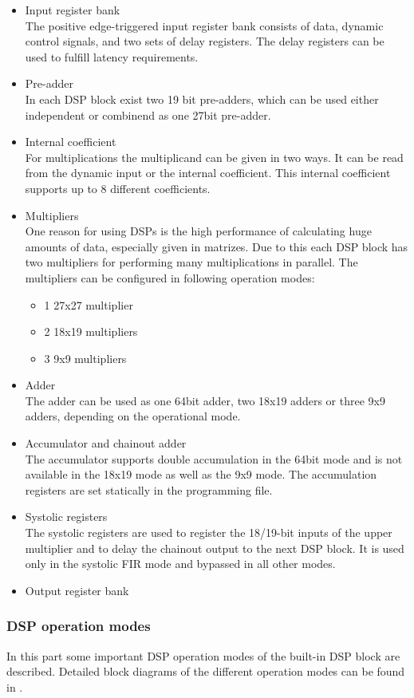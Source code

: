 \begin{itemize}
\item Input register bank\\
The positive edge-triggered input register bank consists of data, dynamic control signals, and two sets of delay registers. The delay registers can be used to fulfill latency requirements.
\item Pre-adder\\
In each DSP block exist two 19 bit pre-adders, which can be used either independent or combinend as one 27bit pre-adder.
\item Internal coefficient\\
For multiplications the multiplicand can be given in two ways. It can be read from the dynamic input or the internal coefficient. This internal coefficient supports up to 8 different coefficients.
\item Multipliers\\
One reason for using DSPs is the high performance of calculating huge amounts of data, especially given in matrizes. Due to this each DSP block has two multipliers for performing many multiplications in parallel. The multipliers can be configured in following operation modes:
\begin{itemize}
\item 1 27x27 multiplier
\item 2 18x19 multipliers
\item 3 9x9 multipliers
\end{itemize}
\item Adder\\
The adder can be used as one 64bit adder, two 18x19 adders or three 9x9 adders, depending on the operational mode.
\item Accumulator and chainout adder\\
The accumulator supports double accumulation in the 64bit mode and is not available in the 18x19 mode as well as the 9x9 mode. The accumulation registers are set statically in the programming file. 
\item Systolic registers\\
The systolic registers are used to register the 18/19-bit inputs of the upper multiplier and to delay the chainout output to the next DSP block. It is used only in the systolic FIR mode and bypassed in all other modes. 
\item Output register bank
\end{itemize}
\subsubsection{DSP operation modes}
In this part some important DSP operation modes of the built-in DSP block are described. Detailed block diagrams of the different operation modes can be found in \cite[chapter 3]{AlteraFPGA15}.
